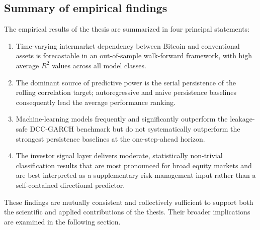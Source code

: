 \subsection{Summary of empirical findings}

The empirical results of the thesis are summarized in four principal statements:

\begin{enumerate}
    \item Time-varying intermarket dependency between Bitcoin and conventional assets is forecastable in an out-of-sample walk-forward framework, with high average $R^2$ values across all model classes.
    \item The dominant source of predictive power is the serial persistence of the rolling correlation target; autoregressive and naive persistence baselines consequently lead the average performance ranking.
    \item Machine-learning models frequently and significantly outperform the leakage-safe DCC-GARCH benchmark but do not systematically outperform the strongest persistence baselines at the one-step-ahead horizon.
    \item The investor signal layer delivers moderate, statistically non-trivial classification results that are most pronounced for broad equity markets and are best interpreted as a supplementary risk-management input rather than a self-contained directional predictor.
\end{enumerate}

These findings are mutually consistent and collectively sufficient to support both the scientific and applied contributions of the thesis. Their broader implications are examined in the following section.
